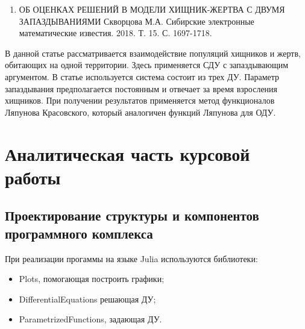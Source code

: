 \documentclass[
  13pt,
  fontsize=13pt,
  russian,
  a4paper,
,captions=tableheading
]{scrreprt}
\providecommand{\tightlist}{%
  \setlength{\itemsep}{0pt}\setlength{\parskip}{0pt}}
\begin{document}
\begin{enumerate}
\def\labelenumi{\arabic{enumi}.}
\setcounter{enumi}{4}
\tightlist
\item
  ОБ ОЦЕНКАХ РЕШЕНИЙ В МОДЕЛИ ХИЩНИК-ЖЕРТВА С ДВУМЯ ЗАПАЗДЫВАНИЯМИ
  Скворцова М.А. Сибирские электронные математические известия. 2018. Т.
  15. С. 1697-1718.
\end{enumerate}

В данной статье рассматривается взаимодействие популяций хищников и
жертв, обитающих на одной территории. Здесь применяется СДУ с
запаздывающим аргументом. В статье используется система состоит из трех
ДУ. Параметр запаздывания предполагается постоянным и отвечает за время
взросления хищников. При получении результатов применяется метод
функционалов Ляпунова Красовского, который аналогичен функций Ляпунова
для ОДУ.

\hypertarget{ux430ux43dux430ux43bux438ux442ux438ux447ux435ux441ux43aux430ux44f-ux447ux430ux441ux442ux44c-ux43aux443ux440ux441ux43eux432ux43eux439-ux440ux430ux431ux43eux442ux44b}{%
\chapter{Аналитическая часть курсовой
работы}\label{ux430ux43dux430ux43bux438ux442ux438ux447ux435ux441ux43aux430ux44f-ux447ux430ux441ux442ux44c-ux43aux443ux440ux441ux43eux432ux43eux439-ux440ux430ux431ux43eux442ux44b}}

\hypertarget{ux43fux440ux43eux435ux43aux442ux438ux440ux43eux432ux430ux43dux438ux435-ux441ux442ux440ux443ux43aux442ux443ux440ux44b-ux438-ux43aux43eux43cux43fux43eux43dux435ux43dux442ux43eux432-ux43fux440ux43eux433ux440ux430ux43cux43cux43dux43eux433ux43e-ux43aux43eux43cux43fux43bux435ux43aux441ux430}{%
\section{Проектирование структуры и компонентов программного
комплекса}\label{ux43fux440ux43eux435ux43aux442ux438ux440ux43eux432ux430ux43dux438ux435-ux441ux442ux440ux443ux43aux442ux443ux440ux44b-ux438-ux43aux43eux43cux43fux43eux43dux435ux43dux442ux43eux432-ux43fux440ux43eux433ux440ux430ux43cux43cux43dux43eux433ux43e-ux43aux43eux43cux43fux43bux435ux43aux441ux430}}

При реализации прогаммы на языке Julia используются библиотеки:

\begin{itemize}
\tightlist
\item
  Plots, помогающая построить графики;
\item
  DifferentialEquations решающая ДУ;
\item
  ParametrizedFunctions, задающая ДУ.
\end{itemize}
\end{document}
